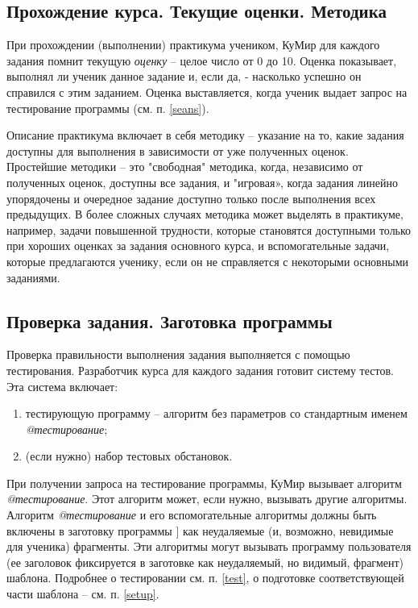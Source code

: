 \subsection {Прохождение курса. Текущие оценки. Методика}
При прохождении (выполнении) практикума учеником, КуМир для каждого задания помнит текущую \emph{оценку} – целое число от 0 до 10. 
Оценка показывает, выполнял ли ученик данное задание и, если да, -  насколько успешно он справился с этим заданием. 
Оценка выставляется, когда ученик выдает запрос на тестирование программы (см. п. \ref{seans}).
	
Описание практикума включает в себя методику – указание на то, какие задания доступны для выполнения в зависимости от уже полученных оценок. Простейшие методики – это "свободная" методика, когда, независимо от полученных оценок, доступны все задания, и "игровая», когда задания линейно упорядочены и очередное задание доступно только после выполнения всех предыдущих. В более сложных случаях методика может выделять в практикуме, например, задачи повышенной трудности, которые становятся доступными только при хороших оценках за задания основного курса, и вспомогательные задачи, которые предлагаются ученику, если он не справляется с некоторыми основными заданиями.



\subsection {Проверка задания. Заготовка программы }
Проверка правильности выполнения задания выполняется с помощью тестирования. Разработчик курса для каждого задания готовит систему тестов. Эта система включает:
\begin{enumerate}
\item	тестирующую программу – алгоритм без параметров со стандартным именем \emph{@тестирование};
\item	(если нужно) набор тестовых обстановок. 
\end{enumerate}
	При получении запроса на тестирование программы, КуМир вызывает алгоритм \emph{@тестирование}. 
	Этот алгоритм может, если нужно, вызывать другие алгоритмы. Алгоритм \emph{@тестирование} и его вспомогательные алгоритмы должны быть включены в заготовку программы ]
	как неудаляемые (и, возможно, невидимые для ученика) фрагменты. Эти алгоритмы могут вызывать программу пользователя 
	(ее заголовок фиксируется в заготовке как неудаляемый, но видимый, фрагмент) шаблона. Подробнее о тестировании см. п. \ref{test}, 
	о подготовке соответствующей части шаблона – см. п. \ref{setup}.


